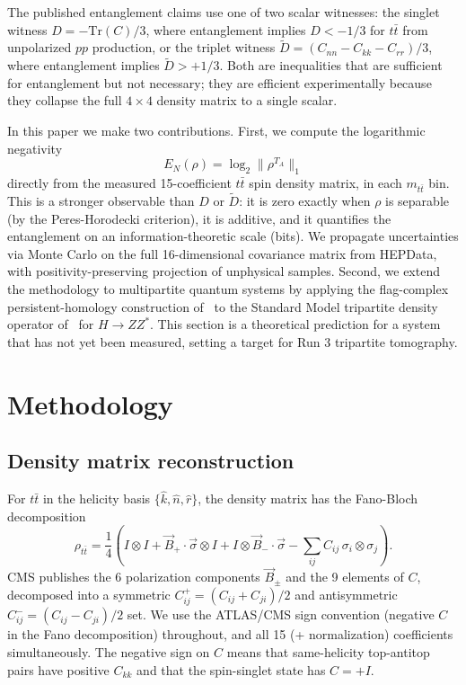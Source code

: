 \documentclass[11pt,a4paper]{article}
\theoremstyle{definition}
\begin{document}
The published entanglement claims use one of two scalar witnesses: the singlet witness $D = -\text{Tr}(C)/3$, where entanglement implies $D < -1/3$ for $t\bar{t}$ from unpolarized $pp$ production, or the triplet witness $\tilde{D} = (C_{nn} - C_{kk} - C_{rr})/3$, where entanglement implies $\tilde{D} > +1/3$. Both are inequalities that are sufficient for entanglement but not necessary; they are efficient experimentally because they collapse the full $4 \times 4$ density matrix to a single scalar.

In this paper we make two contributions. First, we compute the logarithmic negativity
\begin{equation}
E_N(\rho) = \log_2 \lVert \rho^{T_A} \rVert_1
\end{equation}
directly from the measured 15-coefficient $t\bar{t}$ spin density matrix, in each $m_{t\bar{t}}$ bin. This is a stronger observable than $D$ or $\tilde{D}$: it is zero exactly when $\rho$ is separable (by the Peres-Horodecki criterion), it is additive, and it quantifies the entanglement on an information-theoretic scale (bits). We propagate uncertainties via Monte Carlo on the full 16-dimensional covariance matrix from HEPData, with positivity-preserving projection of unphysical samples. Second, we extend the methodology to multipartite quantum systems by applying the flag-complex persistent-homology construction of~\cite{Scott2026RWF} to the Standard Model tripartite density operator of~\cite{AS2024} for $H \to ZZ^*$. This section is a theoretical prediction for a system that has not yet been measured, setting a target for Run 3 tripartite tomography.

\section{Methodology}\label{sec:methodology}

\subsection{Density matrix reconstruction}

For $t\bar{t}$ in the helicity basis $\{\hat{k}, \hat{n}, \hat{r}\}$, the density matrix has the Fano-Bloch decomposition
\begin{equation}
\rho_{t\bar{t}} = \frac{1}{4}\!\left(I \otimes I + \vec{B}_+ \cdot \vec{\sigma} \otimes I + I \otimes \vec{B}_- \cdot \vec{\sigma} - \sum_{ij} C_{ij}\, \sigma_i \otimes \sigma_j\right). \label{eq:fano}
\end{equation}
CMS publishes the 6 polarization components $\vec{B}_\pm$ and the 9 elements of $C$, decomposed into a symmetric $C_{ij}^+ = (C_{ij} + C_{ji})/2$ and antisymmetric $C_{ij}^- = (C_{ij} - C_{ji})/2$ set. We use the ATLAS/CMS sign convention (negative $C$ in the Fano decomposition) throughout, and all 15 (+ normalization) coefficients simultaneously. The negative sign on $C$ means that same-helicity top-antitop pairs have positive $C_{kk}$ and that the spin-singlet state has $C = +I$.
\end{document}
